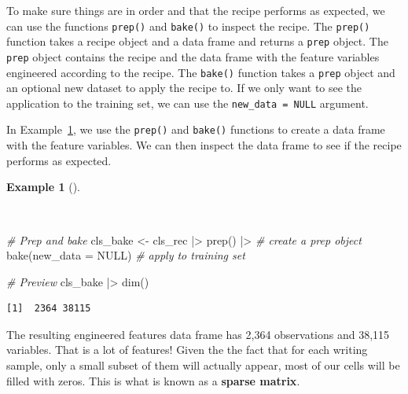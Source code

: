\documentclass[
  letterpaper,
]{book}
\newenvironment{Shaded}{\begin{snugshade}}{\end{snugshade}}
\newcommand{\AttributeTok}[1]{\textcolor[rgb]{0.00,0.00,0.00}{#1}}
\newcommand{\CommentTok}[1]{\textcolor[rgb]{0.00,0.00,0.00}{\textit{#1}}}
\newcommand{\ConstantTok}[1]{\textcolor[rgb]{0.00,0.00,0.00}{#1}}
\newcommand{\FunctionTok}[1]{\textcolor[rgb]{0.00,0.00,0.00}{#1}}
\newcommand{\NormalTok}[1]{\textcolor[rgb]{0.00,0.00,0.00}{#1}}
\newcommand{\OtherTok}[1]{\textcolor[rgb]{0.00,0.00,0.00}{#1}}
\newcommand{\SpecialCharTok}[1]{\textcolor[rgb]{0.00,0.00,0.00}{#1}}
\theoremstyle{definition}
\newtheorem{example}{Example}[chapter]
\theoremstyle{remark}
\begin{document}
To make sure things are in order and that the recipe performs as
expected, we can use the functions \texttt{prep()} and \texttt{bake()}
to inspect the recipe. The \texttt{prep()} function takes a recipe
object and a data frame and returns a \texttt{prep} object. The
\texttt{prep} object contains the recipe and the data frame with the
feature variables engineered according to the recipe. The
\texttt{bake()} function takes a \texttt{prep} object and an optional
new dataset to apply the recipe to. If we only want to see the
application to the training set, we can use the
\texttt{new\_data\ =\ NULL} argument.

In Example~\ref{exm-predict-class-recipe-prep}, we use the
\texttt{prep()} and \texttt{bake()} functions to create a data frame
with the feature variables. We can then inspect the data frame to see if
the recipe performs as expected.

\begin{example}[]\protect\hypertarget{exm-predict-class-recipe-prep}{}\label{exm-predict-class-recipe-prep}

~

\begin{Shaded}
\begin{Highlighting}[]
\CommentTok{\# Prep and bake}
\NormalTok{cls\_bake }\OtherTok{\textless{}{-}}
\NormalTok{  cls\_rec }\SpecialCharTok{|\textgreater{}}
  \FunctionTok{prep}\NormalTok{() }\SpecialCharTok{|\textgreater{}} \CommentTok{\# create a prep object}
  \FunctionTok{bake}\NormalTok{(}\AttributeTok{new\_data =} \ConstantTok{NULL}\NormalTok{) }\CommentTok{\# apply to training set}

\CommentTok{\# Preview}
\NormalTok{cls\_bake }\SpecialCharTok{|\textgreater{}} \FunctionTok{dim}\NormalTok{()}
\end{Highlighting}
\end{Shaded}

\begin{verbatim}
[1]  2364 38115
\end{verbatim}

\end{example}

The resulting engineered features data frame has 2,364 observations and
38,115 variables. That is a lot of features! Given the the fact that for
each writing sample, only a small subset of them will actually appear,
most of our cells will be filled with zeros. This is what is known as a
\textbf{sparse matrix}.
\end{document}
